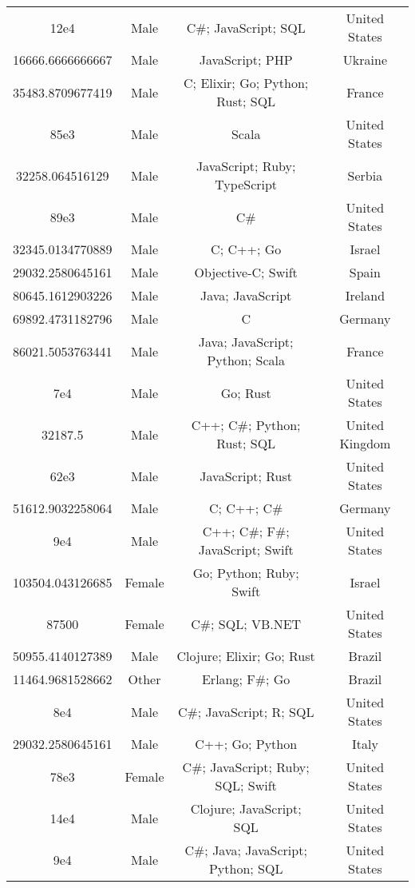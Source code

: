 \begin{center}
\begin{tabular}{ |c|c|c|c| }
12e4  &  Male  &  C\#; JavaScript; SQL  &  United States  \\ 
16666.6666666667  &  Male  &  JavaScript; PHP  &  Ukraine  \\ 
35483.8709677419  &  Male  &  C; Elixir; Go; Python; Rust; SQL  &  France  \\ 
85e3  &  Male  &  Scala  &  United States  \\ 
32258.064516129  &  Male  &  JavaScript; Ruby; TypeScript  &  Serbia  \\ 
89e3  &  Male  &  C\#  &  United States  \\ 
32345.0134770889  &  Male  &  C; C++; Go  &  Israel  \\ 
29032.2580645161  &  Male  &  Objective-C; Swift  &  Spain  \\ 
80645.1612903226  &  Male  &  Java; JavaScript  &  Ireland  \\ 
69892.4731182796  &  Male  &  C  &  Germany  \\ 
86021.5053763441  &  Male  &  Java; JavaScript; Python; Scala  &  France  \\ 
7e4  &  Male  &  Go; Rust  &  United States  \\ 
32187.5  &  Male  &  C++; C\#; Python; Rust; SQL  &  United Kingdom  \\ 
62e3  &  Male  &  JavaScript; Rust  &  United States  \\ 
51612.9032258064  &  Male  &  C; C++; C\#  &  Germany  \\ 
9e4  &  Male  &  C++; C\#; F\#; JavaScript; Swift  &  United States  \\ 
103504.043126685  &  Female  &  Go; Python; Ruby; Swift  &  Israel  \\ 
87500  &  Female  &  C\#; SQL; VB.NET  &  United States  \\ 
50955.4140127389  &  Male  &  Clojure; Elixir; Go; Rust  &  Brazil  \\ 
11464.9681528662  &  Other  &  Erlang; F\#; Go  &  Brazil  \\ 
8e4  &  Male  &  C\#; JavaScript; R; SQL  &  United States  \\ 
29032.2580645161  &  Male  &  C++; Go; Python  &  Italy  \\ 
78e3  &  Female  &  C\#; JavaScript; Ruby; SQL; Swift  &  United States  \\ 
14e4  &  Male  &  Clojure; JavaScript; SQL  &  United States  \\ 
9e4  &  Male  &  C\#; Java; JavaScript; Python; SQL  &  United States  \\ 

\end{tabular}
\end{center}
